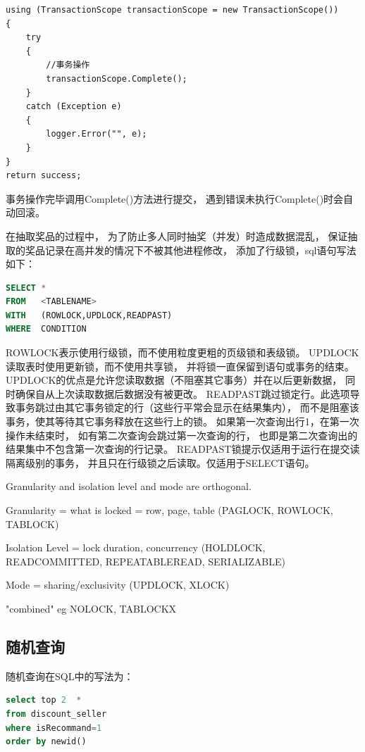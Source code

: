 \documentclass{book}
\begin{document}
\begin{lstlisting}[language={[Sharp]C}]
using (TransactionScope transactionScope = new TransactionScope())
{
    try
    {
        //事务操作          
        transactionScope.Complete();
    }
    catch (Exception e)
    {
        logger.Error("", e);        
    }
}
return success;
\end{lstlisting}

事务操作完毕调用Complete()方法进行提交，
遇到错误未执行Complete()时会自动回滚。

在抽取奖品的过程中，
为了防止多人同时抽奖（并发）时造成数据混乱，
保证抽取的奖品记录在高并发的情况下不被其他进程修改，
添加了行级锁，sql语句写法如下：

\begin{lstlisting}[language=SQL]
SELECT *
FROM   <TABLENAME>
WITH   (ROWLOCK,UPDLOCK,READPAST)
WHERE  CONDITION
\end{lstlisting}

ROWLOCK表示使用行级锁，而不使用粒度更粗的页级锁和表级锁。
UPDLOCK读取表时使用更新锁，而不使用共享锁，
并将锁一直保留到语句或事务的结束。
UPDLOCK的优点是允许您读取数据（不阻塞其它事务）并在以后更新数据，
同时确保自从上次读取数据后数据没有被更改。  
READPAST跳过锁定行。此选项导致事务跳过由其它事务锁定的行（这些行平常会显示在结果集内），
而不是阻塞该事务，使其等待其它事务释放在这些行上的锁。
如果第一次查询出行1，在第一次操作未结束时，
如有第二次查询会跳过第一次查询的行，
也即是第二次查询出的结果集中不包含第一次查询的行记录。
READPAST锁提示仅适用于运行在提交读隔离级别的事务，
并且只在行级锁之后读取。仅适用于SELECT语句。 

Granularity and isolation level and mode are orthogonal.

Granularity = what is locked = row, page, table (PAGLOCK, ROWLOCK, TABLOCK)

Isolation Level = lock duration, concurrency (HOLDLOCK, READCOMMITTED, REPEATABLEREAD, SERIALIZABLE)

Mode = sharing/exclusivity (UPDLOCK, XLOCK)

"combined" eg NOLOCK, TABLOCKX

\subsection{随机查询}

随机查询在SQL中的写法为：

\begin{lstlisting}[language=SQL]
select top 2  * 
from discount_seller
where isRecommand=1
order by newid()
\end{lstlisting}
\end{document}
